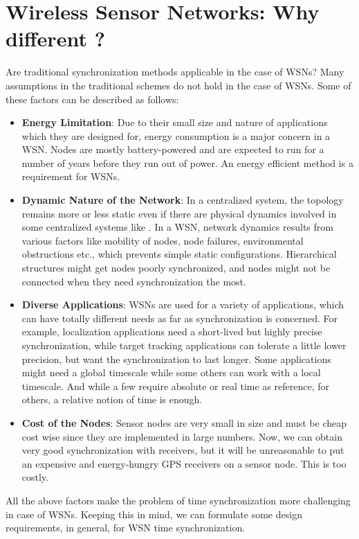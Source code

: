 \documentclass[a4paper,10pt]{report}
\begin{document}
\section{\textbf{Wireless Sensor Networks: Why different ?}}
Are traditional synchronization methods applicable in the case of WSNs? Many assumptions in the traditional schemes do not
hold in the case of WSNs. Some of these factors can be described as follows:
\begin{itemize}
\item \textbf{Energy Limitation}: Due to their small size and nature of applications which they are designed for, energy consumption is a major concern in a WSN. Nodes are mostly battery-powered and are expected to run for a number of years before they run out of power. An energy efficient method is a requirement for WSNs.
\item \textbf{Dynamic Nature of the Network}: In a centralized system, the topology remains more or less static even if there are physical
dynamics involved  in some centralized systems like . In a WSN, network dynamics
results from various factors like mobility of nodes, node failures, environmental obstructions etc., which prevents simple static
configurations. Hierarchical structures might get nodes poorly synchronized, and nodes might not be connected when they need
synchronization the most.
\item \textbf{Diverse Applications}: WSNs are used for a variety of applications, which can have totally different needs as far as synchronization is concerned. For example, localization applications need a short-lived but highly
precise synchronization, while target tracking applications can tolerate a little lower precision, but want the synchronization to
last longer. Some applications might need a global timescale while some others can work with a local timescale. And while a few require
absolute or real time as reference, for others, a relative notion of time is enough.
\item \textbf{Cost of the Nodes}: Sensor nodes are very small in size and must be cheap cost wise since they are implemented in large
numbers. Now, we can obtain very good synchronization with  receivers, but it will be unreasonable to put an expensive and energy-hungry GPS receivers on a sensor node. This is too costly.
\end{itemize}
All the above factors make the problem of time synchronization more challenging in case of WSNs. Keeping this in mind, we can formulate
some design requirements, in general, for WSN time synchronization.
\end{document}
